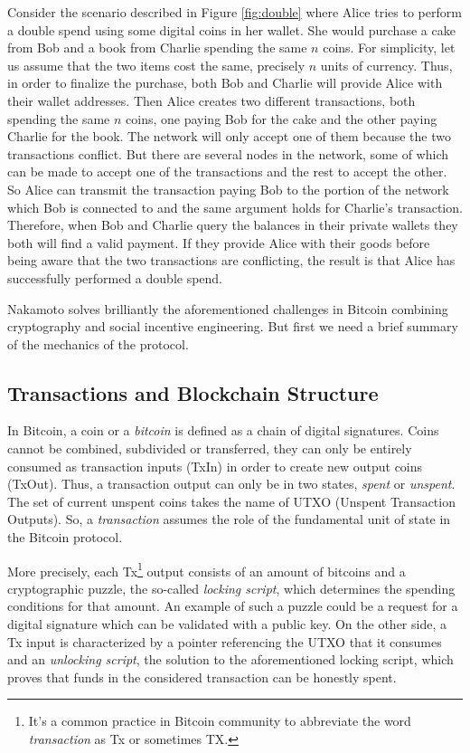 \bigskip
\noindent
Consider the scenario described in Figure \ref{fig:double} where Alice tries to perform a double spend using some digital coins in her wallet. She would purchase a cake from Bob and a book from Charlie spending the same $n$ coins. For simplicity, let us assume that the two items cost the same, precisely $n$ units of currency. Thus, in order to finalize the purchase, both Bob and Charlie will provide Alice with their wallet addresses. Then Alice creates two different transactions, both spending the same $n$ coins, one paying Bob for the cake and the other paying Charlie for the book. The network will only accept one of them because the two transactions conflict. But there are several nodes in the network, some of which can be made to accept one of the transactions and the rest to accept the other. So Alice can transmit the transaction paying Bob to the portion of the network which Bob is connected to and the same argument holds for Charlie's transaction. Therefore, when Bob and Charlie query the balances in their private wallets they both will find a valid payment. If they provide Alice with their goods before being aware that the two transactions are conflicting, the result is that Alice has successfully performed a double spend.

\bigskip
\noindent
Nakamoto solves brilliantly the aforementioned challenges in Bitcoin combining cryptography and social incentive engineering. But first we need a brief summary of the mechanics of the protocol.

\bigskip
\subsection{Transactions and Blockchain Structure}
In Bitcoin, a coin or a \textit{bitcoin} is defined as a chain of digital signatures. Coins cannot be combined, subdivided or transferred, they can only be entirely consumed as transaction inputs (TxIn) in order to create new output coins (TxOut). Thus, a transaction output can only be in two states, \textit{spent} or \textit{unspent}. The set of current unspent coins takes the name of UTXO (Unspent Transaction Outputs). So, a \textit{transaction} assumes the role of the fundamental unit of state in the Bitcoin protocol.

\bigskip
\noindent
More precisely, each Tx\footnote{It's a common practice in Bitcoin community to abbreviate the word \textit{transaction} as Tx or sometimes TX.} output consists of an amount of bitcoins and a cryptographic puzzle, the so-called \textit{locking script}, which determines the spending conditions for that amount. An example of such a puzzle could be a request for a digital signature which can be validated with a public key. On the other side, a Tx input is characterized by a pointer referencing the UTXO that it consumes and an \textit{unlocking script}, the solution to the aforementioned locking script, which proves that funds in the considered transaction can be honestly spent.


